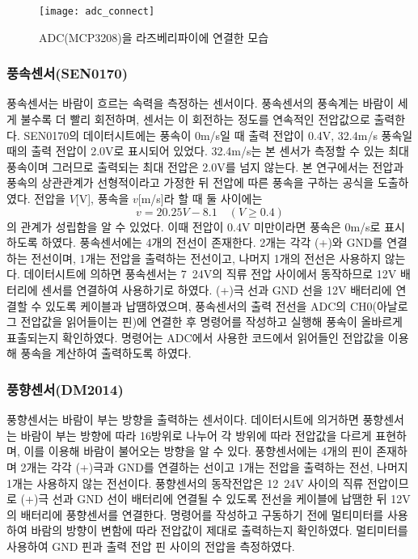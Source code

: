 \begin{figure}[htbp]
	\centering
	\texttt{[image: adc\_connect]}
	\caption{ADC(MCP3208)을 라즈베리파이에 연결한 모습}
	\label{ADCCON}
\end{figure}

\subsubsection{풍속센서(SEN0170)}
풍속센서는 바람이 흐르는 속력을 측정하는 센서이다. 풍속센서의 풍속계는 바람이 세게 불수록 더 빨리 회전하며, 센서는 이 회전하는 정도를 연속적인 전압값으로 출력한다. SEN0170의 데이터시트에는 풍속이 0m/s일 때 출력 전압이 0.4V, 32.4m/s 풍속일 때의 출력 전압이 2.0V로 표시되어 있었다. 32.4m/s는 본 센서가 측정할 수 있는 최대 풍속이며 그러므로 출력되는 최대 전압은 2.0V를 넘지 않는다. 본 연구에서는 전압과 풍속의 상관관계가 선형적이라고 가정한 뒤 전압에 따른 풍속을 구하는 공식을 도출하였다. 전압을 $V$[V], 풍속을 $v$[m/s]라 할 때 둘 사이에는
\[ v=20.25V-8.1\quad (V\geq 0.4)\]
의 관계가 성립함을 알 수 있었다. 이때 전압이 0.4V 미만이라면 풍속은 0m/s로 표시하도록 하였다.
풍속센서에는 4개의 전선이 존재한다. 2개는 각각 (+)와 GND를 연결하는 전선이며, 1개는 전압을 출력하는 전선이고, 나머지 1개의 전선은 사용하지 않는다. 데이터시트에 의하면 풍속센서는 7~24V의 직류 전압 사이에서 동작하므로 12V 배터리에 센서를 연결하여 사용하기로 하였다. (+)극 선과 GND 선을 12V 배터리에 연결할 수 있도록 케이블과 납땜하였으며, 풍속센서의 출력 전선을 ADC의 CH0(아날로그 전압값을 읽어들이는 핀)에 연결한 후 명령어를 작성하고 실행해 풍속이 올바르게 표출되는지 확인하였다. 명령어는 ADC에서 사용한 코드에서 읽어들인 전압값을 이용해 풍속을 계산하여 출력하도록 하였다.

\subsubsection{풍향센서(DM2014)}
풍향센서는 바람이 부는 방향을 출력하는 센서이다. 데이터시트에 의거하면 풍향센서는 바람이 부는 방향에 따라 16방위로 나누어 각 방위에 따라 전압값을 다르게 표현하며, 이를 이용해 바람이 불어오는 방향을 알 수 있다. 풍향센서에는 4개의 핀이 존재하며 2개는 각각 (+)극과 GND를 연결하는 선이고 1개는 전압을 출력하는 전선, 나머지 1개는 사용하지 않는 전선이다. 풍향센서의 동작전압은 12~24V 사이의 직류 전압이므로 (+)극 선과 GND 선이 배터리에 연결될 수 있도록 전선을 케이블에 납땜한 뒤 12V의 배터리에 풍향센서를 연결한다. 명령어를 작성하고 구동하기 전에 멀티미터를 사용하여 바람의 방향이 변함에 따라 전압값이 제대로 출력하는지 확인하였다. 멀티미터를 사용하여 GND 핀과 출력 전압 핀 사이의 전압을 측정하였다.

